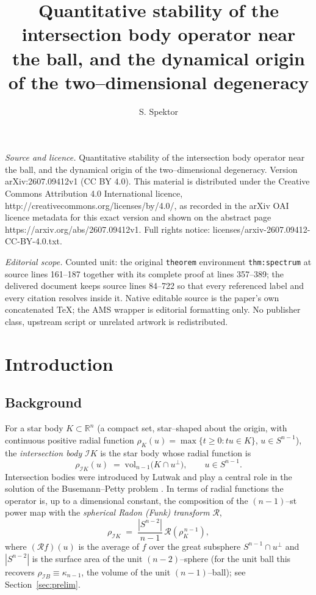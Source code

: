\documentclass[10pt,a4paper]{amsart}
\newcommand{\R}{\mathbb{R}}
\newcommand{\Sph}{S^{n-1}}
\newcommand{\Rad}{\mathcal{R}}
\newcommand{\IB}{\mathcal{I}}
\newcommand{\abs}[1]{\left\lvert #1 \right\rvert}
\begin{document}
\title[Quantitative stability of the intersection body operator nea]{Quantitative stability of the intersection body operator near the ball, and the dynamical origin of the two--dimensional degeneracy}
\author{S. Spektor}
\date{}
\maketitle
\noindent\emph{Source and licence.} Quantitative stability of the intersection body operator near the ball, and the dynamical origin of the two--dimensional degeneracy. Version arXiv:2607.09412v1 (CC BY 4.0). This material is distributed under the Creative Commons Attribution 4.0 International licence, http://creativecommons.org/licenses/by/4.0/, as recorded in the arXiv OAI licence metadata for this exact version and shown on the abstract page https://arxiv.org/abs/2607.09412v1. Full rights notice: licenses/arxiv-2607.09412-CC-BY-4.0.txt.\par\smallskip
\noindent\textit{Editorial scope.} Counted unit: the original \texttt{theorem} environment \texttt{thm:spectrum} at source lines 161--187 together with its complete proof at lines 357--389; the delivered document keeps source lines 84--722 so that every referenced label and every citation resolves inside it. Native editable source is the paper's own concatenated TeX; the AMS wrapper is editorial formatting only. No publisher class, upstream script or unrelated artwork is redistributed.
\section{Introduction}

\subsection{Background}
For a star body $K\subset\R^n$ (a compact set, star--shaped about the origin,
with continuous positive radial function $\rho_K(u)=\max\{t\ge 0: tu\in K\}$,
$u\in\Sph$), the \emph{intersection body} $\IB K$ is the star body whose radial
function is
\[
   \rho_{\IB K}(u) \;=\; \mathrm{vol}_{n-1}\big(K\cap u^{\perp}\big),
   \qquad u\in\Sph .
\]
Intersection bodies were introduced by Lutwak and play a central role in the
solution of the Busemann--Petty problem
\cite{Lutwak1988,Gardner1994,GKS1999,Koldobsky2005}. In terms of radial
functions the operator is, up to a dimensional constant, the composition of the
$(n-1)$--st power map with the \emph{spherical Radon (Funk) transform} $\Rad$,
\begin{equation}\label{eq:IB-radial}
   \rho_{\IB K} \;=\; \frac{\abs{S^{n-2}}}{n-1}\,\Rad\!\left(\rho_K^{\,n-1}\right),
\end{equation}
where $(\Rad f)(u)$ is the average of $f$ over the great subsphere
$\Sph\cap u^{\perp}$ and $\abs{S^{n-2}}$ is the surface area of the unit
$(n-2)$--sphere (for the unit ball this recovers
$\rho_{\IB B}\equiv\kappa_{n-1}$, the volume of the unit $(n-1)$--ball); see
Section~\ref{sec:prelim}.
\end{document}
